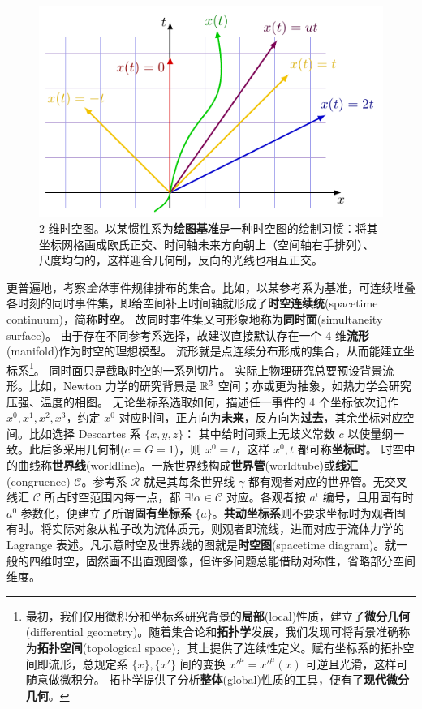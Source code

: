\begin{figure}
    \centering
    \includegraphics[width=.5\textwidth]{fig/chpt01/worldlines.pdf}
    \caption{\small 2 维时空图。以某惯性系为\textbf{绘图基准}是一种时空图的绘制习惯：将其坐标网格画成欧氏正交、时间轴未来方向朝上（空间轴右手排列）、尺度均匀的，这样迎合几何制，反向的光线也相互正交。}
\end{figure}

更普遍地，考察\textit{全体}事件规律排布的集合。比如，以某参考系为基准，可连续堆叠各时刻的同时事件集，即给空间补上时间轴就形成了\textbf{时空连续统}(spacetime continuum)，简称\textbf{时空}。
故同时事件集又可形象地称为\textbf{同时面}(simultaneity surface)。
由于存在不同参考系选择，故建议直接默认存在一个 4 维\textbf{流形}(manifold)作为时空的理想模型。
流形就是点连续分布形成的集合，从而能建立坐标系\footnote{最初，我们仅用微积分和坐标系研究背景的\textbf{局部}(local)性质，建立了\textbf{微分几何}(differential geometry)。随着集合论和\textbf{拓扑学}发展，我们发现可将背景准确称为\textbf{拓扑空间}(topological space)，其上提供了连续性定义。赋有坐标系的拓扑空间即流形，总规定系 $\{x\},\{x'\}$ 间的变换 $x'^\mu=x'^\mu(x)$ 可逆且光滑，这样可随意做微积分。
拓扑学提供了分析\textbf{整体}(global)性质的工具，便有了\textbf{现代微分几何}。}。
同时面只是截取时空的一系列切片。
实际上物理研究总要预设背景流形。比如，Newton 力学的研究背景是 $\mathbb{R}^3$ 空间；亦或更为抽象，如热力学会研究压强、温度的相图。
无论坐标系选取如何，描述任一事件的 4 个坐标依次记作 $x^0,x^1,x^2,x^3$，约定 $x^0$ 对应时间，正方向为\textbf{未来}，反方向为\textbf{过去}，其余坐标对应空间。比如选择 Descartes 系 $\{x,y,z\}$：
其中给时间乘上无歧义常数 $c$ 以使量纲一致。此后多采用几何制($c=G=1$)，则 $x^0=t$，这样 $x^0,t$ 都可称\textbf{坐标时}。
时空中的曲线称\textbf{世界线}(worldline)。一族世界线构成\textbf{世界管}(worldtube)或\textbf{线汇}(congruence) $\mathscr C$。参考系 $\mathscr R$ 就是其每条世界线 $\gamma$ 都有观者对应的世界管。无交叉线汇 $\mathscr C$ 所占时空范围内每一点，都 $\exists! \alpha\in\mathscr C$ 对应。各观者按 $a^i$ 编号，且用固有时 $a^0$ 参数化，便建立了所谓\textbf{固有坐标系} $\{a\}$。\textbf{共动坐标系}则不要求坐标时为观者固有时。将实际对象从粒子改为流体质元，则观者即流线，进而对应于流体力学的 Lagrange 表述。凡示意时空及世界线的图就是\textbf{时空图}(spacetime diagram)。就一般的四维时空，固然画不出直观图像，但许多问题总能借助对称性，省略部分空间维度。

